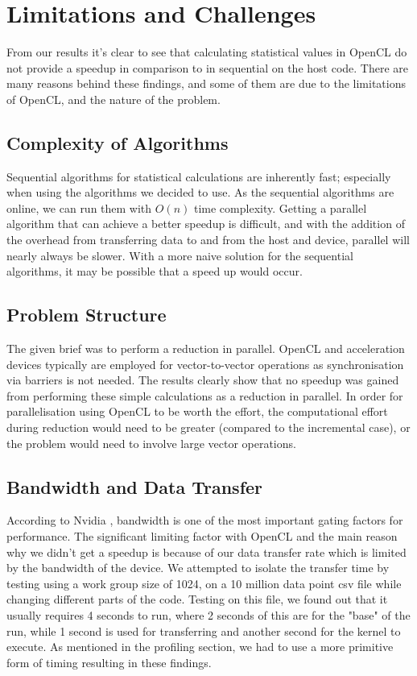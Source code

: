 
  \section{Limitations and Challenges}
  From our results it's clear to see that calculating statistical values in OpenCL do not provide a speedup in comparison to in sequential on the host code. There are many reasons behind these findings, and some of them are due to the limitations of OpenCL, and the nature of the problem.

\subsection{Complexity of Algorithms}
Sequential algorithms for statistical calculations are inherently fast; especially when using the algorithms we decided to use. As the sequential algorithms are online, we can run them with $O(n)$ time complexity. Getting a parallel algorithm that can achieve a better speedup is difficult, and with the addition of the overhead from transferring data to and from the host and device, parallel will nearly always be slower. With a more naive solution for the sequential algorithms, it may be possible that a speed up would occur.

\subsection{Problem Structure}
The given brief was to perform a reduction in parallel. OpenCL and acceleration devices typically are employed for vector-to-vector operations as synchronisation via barriers is not needed. The results clearly show that no speedup was gained from performing these simple calculations as a reduction in parallel. In order for parallelisation using OpenCL to be worth the effort, the computational effort during reduction would need to be greater (compared to the incremental case), or the problem would need to involve large vector operations.

\subsection{Bandwidth and Data Transfer}
According to Nvidia \cite{NVIDIA2010}, bandwidth is one of the most important gating factors for performance. The significant limiting factor with OpenCL and the main reason why we didn't get a speedup is because of our data transfer rate which is limited by the bandwidth of the device.
We attempted to isolate the transfer time by testing using a work group size of 1024, on a 10 million data point csv file while changing different parts of the code. Testing on this file, we found out that it usually requires 4 seconds to run, where 2 seconds of this are for the "base" of the run, while 1 second is used for transferring and another second for the kernel to execute. As mentioned in the profiling section, we had to use a more primitive form of timing resulting in these findings.\\


